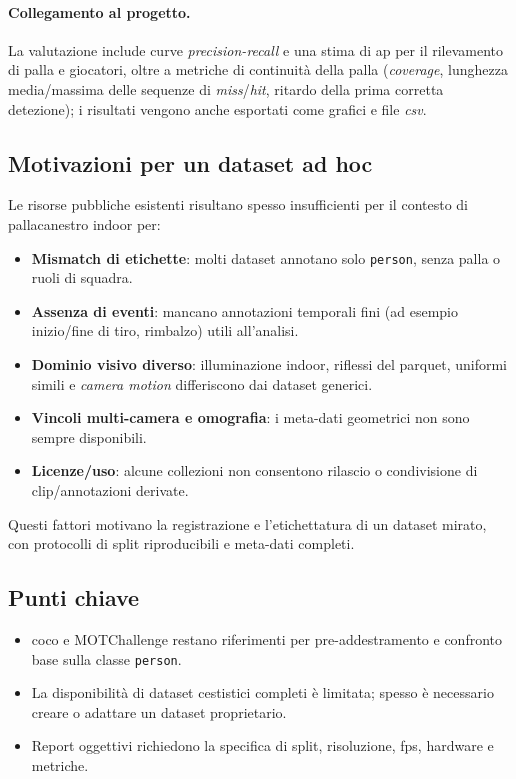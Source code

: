 \documentclass[12pt,a4paper,openright,twoside]{book}
\begin{document}
\paragraph{Collegamento al progetto.} La valutazione include 
curve \emph{precision-recall} e una stima di \ac{ap} per il
rilevamento di palla e giocatori, oltre a metriche di continuità 
della palla (\emph{coverage}, lunghezza media/massima delle
sequenze di \emph{miss}/\emph{hit}, ritardo della prima corretta 
detezione); i risultati vengono anche esportati come grafici e 
file \emph{\ac{csv}}.

\subsection{Motivazioni per un dataset ad hoc}
Le risorse pubbliche esistenti risultano spesso insufficienti 
per il contesto di pallacanestro indoor per:
\begin{itemize}
  \item \textbf{Mismatch di etichette}: molti dataset annotano 
  solo \texttt{person}, senza palla o ruoli di squadra.
  \item \textbf{Assenza di eventi}: mancano annotazioni temporali 
  fini (ad esempio inizio/fine di tiro, rimbalzo) utili all'analisi.
  \item \textbf{Dominio visivo diverso}: illuminazione indoor, 
  riflessi del parquet, uniformi simili e \emph{camera motion} 
  differiscono dai dataset generici.
  \item \textbf{Vincoli multi-camera e omografia}: i meta-dati 
  geometrici non sono sempre disponibili.
  \item \textbf{Licenze/uso}: alcune collezioni non consentono 
  rilascio o condivisione di clip/annotazioni derivate.
\end{itemize}
Questi fattori motivano la registrazione e l'etichettatura 
di un dataset mirato, con protocolli di split riproducibili e meta-dati completi.


\subsection*{Punti chiave}
\begin{itemize}
  \item \ac{coco} e MOTChallenge restano riferimenti per 
  pre-addestramento e confronto base sulla classe 
  \texttt{person}.
  \item La disponibilità di dataset cestistici 
  completi è limitata; spesso è necessario creare 
  o adattare un dataset proprietario.
  \item Report oggettivi richiedono la specifica di split, 
  risoluzione, \ac{fps}, hardware e metriche.
\end{itemize}
\end{document}
